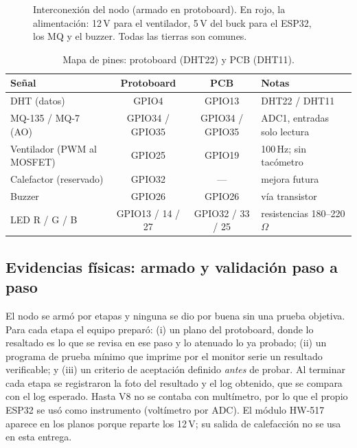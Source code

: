 \documentclass[10pt,a4paper]{article}
\begin{document}
\begin{figure}[H]
\caption{Interconexión del nodo (armado en protoboard). En rojo, la alimentación: 12\,V para el ventilador, 5\,V del buck para el ESP32, los MQ y el buzzer. Todas las tierras son comunes.}
\label{fig:interconexion}
\end{figure}

\begin{table}[H]
\centering\scriptsize
\caption{Mapa de pines: protoboard (DHT22) y PCB (DHT11).}
\label{tab:pines}
\begin{tabular}{lccl}
\toprule
\textbf{Señal} & \textbf{Protoboard} & \textbf{PCB} & \textbf{Notas} \\
\midrule
DHT (datos) & GPIO4 & GPIO13 & DHT22 / DHT11 \\
MQ-135 / MQ-7 (AO) & GPIO34 / GPIO35 & GPIO34 / GPIO35 & ADC1, entradas solo lectura \\
Ventilador (PWM al MOSFET) & GPIO25 & GPIO19 & 100\,Hz; sin tacómetro \\
Calefactor (reservado) & GPIO32 & --- & mejora futura \\
Buzzer & GPIO26 & GPIO26 & vía transistor \\
LED R / G / B & GPIO13 / 14 / 27 & GPIO32 / 33 / 25 & resistencias 180--220\,$\Omega$ \\
\bottomrule
\end{tabular}
\end{table}

\subsection{Evidencias físicas: armado y validación paso a paso}
\label{sec:evidencias}
El nodo se armó por etapas y ninguna se dio por buena sin una prueba objetiva. Para cada etapa el equipo preparó: (i) un plano del protoboard, donde lo resaltado es lo que se revisa en ese paso y lo atenuado lo ya probado; (ii) un programa de prueba mínimo que imprime por el monitor serie un resultado verificable; y (iii) un criterio de aceptación definido \emph{antes} de probar. Al terminar cada etapa se registraron la foto del resultado y el log obtenido, que se compara con el log esperado. Hasta V8 no se contaba con multímetro, por lo que el propio ESP32 se usó como instrumento (voltímetro por ADC). El módulo HW-517 aparece en los planos porque reparte los 12\,V; su salida de calefacción no se usa en esta entrega.
\end{document}
